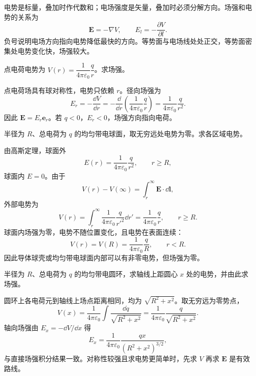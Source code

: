 电势是标量，叠加时作代数和；电场强度是矢量，叠加时必须分解方向。场强和电势的关系为
\[
  \bm E=-\nabla V,\qquad E_l=-\frac{\partial V}{\partial l}.
\]
负号说明电场方向指向电势降低最快的方向。等势面与电场线处处正交，等势面密集处电势变化快，场强较大。

\begin{example}[title={由电势求点电荷场强}]\label{eg:potential-to-field}
点电荷电势为 $V(r)=\dfrac{1}{4\pi\varepsilon_0}\dfrac{q}{r}$。求场强。
\begin{solution}
点电荷场具有球对称性，电势只依赖 $r$。径向场强为
\[
  E_r=-\frac{\dd V}{\dd r}
  =-\frac{\dd}{\dd r}\left(\frac{1}{4\pi\varepsilon_0}\frac{q}{r}\right)
  =\frac{1}{4\pi\varepsilon_0}\frac{q}{r^2}.
\]
因此 $\bm E=E_r\bm e_r$。若 $q<0$，$E_r<0$，场强方向指向电荷。
\end{solution}
\end{example}

\begin{example}[title={均匀带电球面的电势分布}]\label{eg:sphere-potential}
半径为 $R$、总电荷为 $q$ 的均匀带电球面，取无穷远处电势为零。求各区域电势。
\begin{solution}
由高斯定理，球面外
\[
  E(r)=\frac{1}{4\pi\varepsilon_0}\frac{q}{r^2},\qquad r\ge R,
\]
球面内 $E=0$。由于
\[
  V(r)-V(\infty)=\int_r^\infty \bm E\cdot\dd\bm l,
\]
外部电势为
\[
  V(r)=\int_r^\infty \frac{1}{4\pi\varepsilon_0}\frac{q}{r'^2}\dd r'
  =\frac{1}{4\pi\varepsilon_0}\frac{q}{r},\qquad r\ge R.
\]
球面内场强为零，电势不随位置变化，且电势在表面连续：
\[
  V(r)=V(R)=\frac{1}{4\pi\varepsilon_0}\frac{q}{R},\qquad r<R.
\]
因此导体球壳或均匀带电球面内部可以有非零电势，但场强为零。
\end{solution}
\end{example}

\begin{example}[title={由电势叠加求圆环轴线电势}]\label{eg:ring-potential}
半径为 $R$、总电荷为 $q$ 的均匀带电圆环，求轴线上距圆心 $x$ 处的电势，并由此求场强。
\begin{solution}
圆环上各电荷元到轴线上场点距离相同，均为 $\sqrt{R^2+x^2}$。取无穷远为零势点，
\[
  V(x)=\frac{1}{4\pi\varepsilon_0}\int\frac{\dd q}{\sqrt{R^2+x^2}}
  =\frac{1}{4\pi\varepsilon_0}\frac{q}{\sqrt{R^2+x^2}}.
\]
轴向场强由 $E_x=-\dd V/\dd x$ 得
\[
  E_x=\frac{1}{4\pi\varepsilon_0}\frac{qx}{(R^2+x^2)^{3/2}},
\]
与直接场强积分结果一致。对称性较强且求电势更简单时，先求 $V$ 再求 $\bm E$ 是有效路线。
\end{solution}
\end{example}

